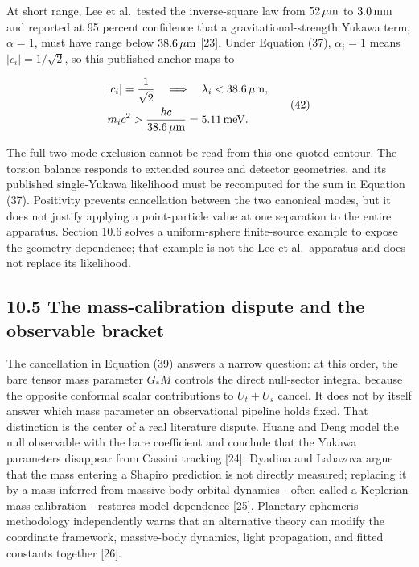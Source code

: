\documentclass[
  american,
  11pt,
  letterpaper,
]{article}
\begin{document}
At short range, Lee et al.~tested the inverse-square law from \(52\,\mu{\rm m}\) to \(3.0\,{\rm mm}\) and reported at 95 percent confidence that a gravitational-strength Yukawa term, \(\alpha=1\), must have range below \(38.6\,\mu{\rm m}\) {[}23{]}. Under Equation (37), \(\alpha_i=1\) means \(|c_i|=1/\sqrt2\), so this published anchor maps to

\begin{equation}
\begin{aligned}
& |c_i|=\frac1{\sqrt2}
\quad\Longrightarrow\quad
\lambda_i<38.6\,\mu{\rm m}, \\
& m_ic^2>\frac{\hbar c}{38.6\,\mu{\rm m}}
=5.11\,{\rm meV}.
\end{aligned}
\tag{42}
\end{equation}

The full two-mode exclusion cannot be read from this one quoted contour. The torsion balance responds to extended source and detector geometries, and its published single-Yukawa likelihood must be recomputed for the sum in Equation (37). Positivity prevents cancellation between the two canonical modes, but it does not justify applying a point-particle value at one separation to the entire apparatus. Section 10.6 solves a uniform-sphere finite-source example to expose the geometry dependence; that example is not the Lee et al.~apparatus and does not replace its likelihood.

\subsection{10.5 The mass-calibration dispute and the observable bracket}\label{the-mass-calibration-dispute-and-the-observable-bracket}

The cancellation in Equation (39) answers a narrow question: at this order, the bare tensor mass parameter \(G_*M\) controls the direct null-sector integral because the opposite conformal scalar contributions to \(U_t+U_s\) cancel. It does not by itself answer which mass parameter an observational pipeline holds fixed. That distinction is the center of a real literature dispute. Huang and Deng model the null observable with the bare coefficient and conclude that the Yukawa parameters disappear from Cassini tracking {[}24{]}. Dyadina and Labazova argue that the mass entering a Shapiro prediction is not directly measured; replacing it by a mass inferred from massive-body orbital dynamics - often called a Keplerian mass calibration - restores model dependence {[}25{]}. Planetary-ephemeris methodology independently warns that an alternative theory can modify the coordinate framework, massive-body dynamics, light propagation, and fitted constants together {[}26{]}.
\end{document}
